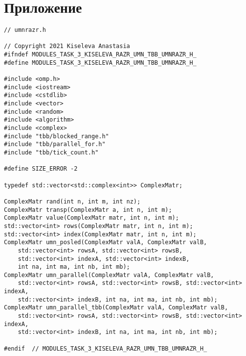 \documentclass{report}
\begin{document}
\section*{Приложение}
\begin{lstlisting}
// umnrazr.h

// Copyright 2021 Kiseleva Anastasia
#ifndef MODULES_TASK_3_KISELEVA_RAZR_UMN_TBB_UMNRAZR_H_
#define MODULES_TASK_3_KISELEVA_RAZR_UMN_TBB_UMNRAZR_H_

#include <omp.h>
#include <iostream>
#include <cstdlib>
#include <vector>
#include <random>
#include <algorithm>
#include <complex>
#include "tbb/blocked_range.h"
#include "tbb/parallel_for.h"
#include "tbb/tick_count.h"

#define SIZE_ERROR -2

typedef std::vector<std::complex<int>> ComplexMatr;

ComplexMatr rand(int n, int m, int nz);
ComplexMatr transp(ComplexMatr a, int n, int m);
ComplexMatr value(ComplexMatr matr, int n, int m);
std::vector<int> rows(ComplexMatr matr, int n, int m);
std::vector<int> index(ComplexMatr matr, int n, int m);
ComplexMatr umn_posled(ComplexMatr valA, ComplexMatr valB,
    std::vector<int> rowsA, std::vector<int> rowsB,
    std::vector<int> indexA, std::vector<int> indexB,
    int na, int ma, int nb, int mb);
ComplexMatr umn_parallel(ComplexMatr valA, ComplexMatr valB,
    std::vector<int> rowsA, std::vector<int> rowsB, std::vector<int> indexA,
    std::vector<int> indexB, int na, int ma, int nb, int mb);
ComplexMatr umn_parallel_tbb(ComplexMatr valA, ComplexMatr valB,
    std::vector<int> rowsA, std::vector<int> rowsB, std::vector<int> indexA,
    std::vector<int> indexB, int na, int ma, int nb, int mb);

#endif  // MODULES_TASK_3_KISELEVA_RAZR_UMN_TBB_UMNRAZR_H_


\end{lstlisting}
\end{document}
